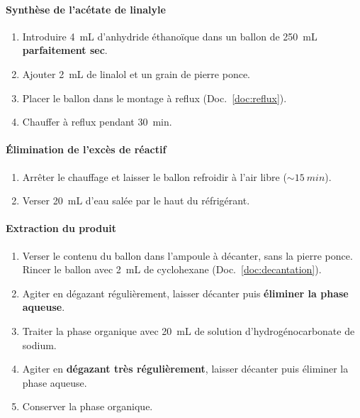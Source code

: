 \documentclass[12pt,a4paper,fleqn]{article}
\begin{document}
\paragraph{Synthèse de l'acétate de linalyle}
\begin{enumerate}
\item Introduire \qty{4}{mL} d'anhydride éthanoïque dans un ballon de \qty{250}{mL} \textbf{parfaitement sec}.
\item Ajouter \qty{2}{mL} de linalol et un grain de pierre ponce.
\item Placer le ballon dans le montage à reflux (Doc.~\ref{doc:reflux}).
\item Chauffer à reflux pendant \qty{30}{min}.
\end{enumerate}

\paragraph{Élimination de l'excès de réactif}
\begin{enumerate}[resume]
\item Arrêter le chauffage et laisser le ballon refroidir à l'air libre ($\sim\qty{15}{min}$).
\item Verser \qty{20}{mL} d'eau salée par le haut du réfrigérant.
\end{enumerate}

\paragraph{Extraction du produit}
\begin{enumerate}[resume]
\item Verser le contenu du ballon dans l'ampoule à décanter, sans la pierre ponce.
Rincer le ballon avec \qty{2}{mL} de cyclohexane (Doc.~\ref{doc:decantation}).
\item Agiter en dégazant régulièrement, laisser décanter puis \textbf{éliminer la phase aqueuse}.
\item \label{step:bicarbonate} Traiter la phase organique avec \qty{20}{mL} de solution d'hydrogénocarbonate de sodium.
\item Agiter en \textbf{dégazant très régulièrement}, laisser décanter puis éliminer la phase aqueuse.
\item Conserver la phase organique.
\end{enumerate}
\end{document}
